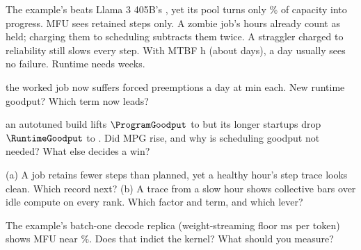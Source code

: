 \documentclass{studysheet}
\begin{document}
\begin{rightcol}
%
  {The example's  beats Llama 3 405B's , yet its pool turns only \% of capacity
   into progress. MFU sees retained steps only.}{}
%
  {A zombie job's hours already count as held; charging them to scheduling subtracts them twice. A straggler charged to reliability still slows every step.}{}
%
  {With MTBF  h (about  days), a day usually sees no failure. Runtime needs weeks.}{}

\vspace{2pt}
\begin{qs}
\item \assumed{} the worked job now suffers  forced preemptions a day at  min each. New runtime goodput?
  Which term now leads?
\item \assumed{} an autotuned build lifts $\ProgramGoodput$ to  but its longer startups drop $\RuntimeGoodput$ to
  . Did MPG rise, and why is scheduling goodput not needed? What else decides a win?
\item (a) A job retains fewer steps than planned, yet a healthy hour's step trace looks clean. Which record next?
  (b) A trace from a slow hour shows collective bars over idle compute on every rank. Which factor and term, and which lever?
\item The example's batch-one decode replica (weight-streaming floor  ms per token) shows MFU near
  \%. Does that indict the kernel? What should you measure?
\end{qs}
\end{rightcol}
\end{document}
